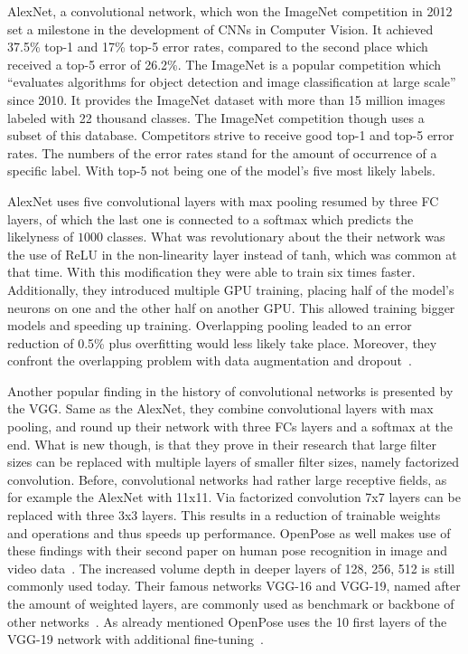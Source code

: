 AlexNet, a convolutional network, which won the \gls{ImageNet} competition in 2012 set a milestone in the development
of \glspl{CNN} in Computer Vision.
It achieved 37.5\% top-1 and 17\% top-5 error rates, compared to the second place which received a top-5 error
of 26.2\%.
The \gls{ImageNet} is a popular competition which
\enquote{evaluates algorithms for object detection and image classification at large scale}~\cite{ILSVRC15}
since 2010.
It provides the ImageNet dataset with more than 15 million images labeled with 22 thousand classes.
The \gls{ImageNet} competition though uses a subset of this database.
Competitors strive to receive good top-1 and top-5 error rates.
The numbers of the error rates stand for the amount of occurrence of a specific label.
With top-5 not being one of the model's five most likely labels.

AlexNet uses five convolutional layers with max pooling resumed by three \gls{FC} layers, of which the last one
is connected to a softmax which predicts the likelyness of $1000$ classes.
What was revolutionary about the their network was the use of \gls{ReLU} in the non-linearity layer instead of tanh,
which was common at that time.
With this modification they were able to train six times faster.
Additionally, they introduced multiple GPU training, placing half of the model's neurons on one and the other half
on another GPU.
This allowed training bigger models and speeding up training.
Overlapping pooling leaded to an error reduction of 0.5\% plus overfitting would less likely take place.
Moreover, they confront the overlapping problem with data augmentation and dropout~\cite{advanceddeeplearningpython, alexnet}.

Another popular finding in the history of convolutional networks is presented by the \gls{VGG}.
Same as the AlexNet, they combine convolutional layers with max pooling, and round up their network with
three \glspl{FC} layers and a softmax at the end.
What is new though, is that they prove in their research that large filter sizes can be replaced with multiple layers of smaller filter sizes, namely
factorized convolution.
Before, convolutional networks had rather large receptive fields, as for example the AlexNet with 11x11.
Via factorized convolution 7x7 layers can be replaced with three 3x3 layers.
This results in a reduction of trainable weights and operations and thus speeds up performance.
OpenPose as well makes use of these findings with their second paper on human pose recognition in image and video data~\cite{openpose}.
The increased volume depth in deeper layers of 128, 256, 512 is still commonly used today.
Their famous networks VGG-16 and VGG-19, named after the amount of weighted layers, are commonly used as benchmark or
backbone of other networks~\cite{advanceddeeplearningpython}.
As already mentioned OpenPose uses the 10 first layers of the VGG-19 network with additional fine-tuning~\cite{openpose}.

